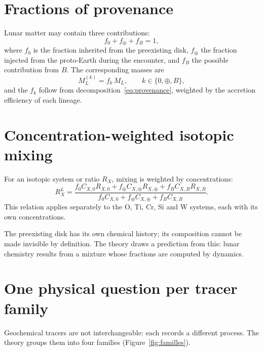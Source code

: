 \documentclass[11pt,a4paper,openany]{report}
\begin{document}
\section{Fractions of provenance}

Lunar matter may contain three contributions:
\begin{equation}
f_0+f_\oplus+f_B=1,
\label{eq:fractions}
\end{equation}
where $f_0$ is the fraction inherited from the preexisting disk, $f_\oplus$ the fraction injected
from the proto-Earth during the encounter, and $f_B$ the possible contribution from $B$. The
corresponding masses are
\begin{equation}
M_L^{(k)}=f_k\,M_L,\qquad k\in\{0,\oplus,B\},
\label{eq:MLk}
\end{equation}
and the $f_k$ follow from decomposition~\eqref{eq:provenance}, weighted by the accretion efficiency
of each lineage.

\section{Concentration-weighted isotopic mixing}

For an isotopic system or ratio $R_X$, mixing is weighted by concentrations:
\begin{equation}
R_X^L=\frac{f_0C_{X,0}R_{X,0}+f_\oplus C_{X,\oplus}R_{X,\oplus}+f_BC_{X,B}R_{X,B}}
{f_0C_{X,0}+f_\oplus C_{X,\oplus}+f_BC_{X,B}}.
\label{eq:melange}
\end{equation}
This relation applies separately to the O, Ti, Cr, Si and W systems, each with its own
concentrations.

\begin{ideephys}
The preexisting disk has its own chemical history; its composition cannot be made invisible by
definition. The theory draws a prediction from this: lunar chemistry results from a mixture whose
fractions are computed by dynamics.
\end{ideephys}

\section{One physical question per tracer family}

Geochemical tracers are not interchangeable: each records a different process. The theory groups
them into four families (Figure~\ref{fig:familles}).
\end{document}
